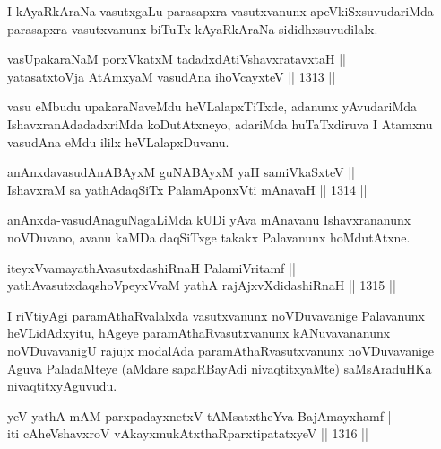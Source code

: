 \begin{artha}
I kAyaRkAraNa vasutxgaLu parasapxra vasutxvanunx apeVkiSxsuvudariMda parasapxra vasutxvanunx biTuTx kAyaRkAraNa sididhxsuvudilalx.
\end{artha}

\begin{shl}
vasUpakaraNaM porxVkatxM tadadxdAtiVshavxratavxtaH || \\
yatasatxtoV\s ja AtAmx\s yaM vasudAna ihoVcayxteV \hfill || 1313 ||  
\end{shl}

\begin{artha}
vasu eMbudu upakaraNaveMdu heVLalapxTiTxde, adanunx yAvudariMda IshavxranAdadadxriMda koDutAtxneyo, adariMda huTaTxdiruva I Atamxnu vasudAna eMdu ililx heVLalapxDuvanu.
\end{artha}

\begin{shl}
anAnxdavasudAnABAyxM guNABAyxM yaH samiVkaSxteV ||  \\
IshavxraM sa yathAdaqSiTx PalamAponxVti mAnavaH \hfill || 1314 ||  
\end{shl}

\begin{artha}
anAnxda-vasudAnaguNagaLiMda kUDi yAva mAnavanu Ishavxrananunx noVDuvano, avanu kaMDa daqSiTxge takakx Palavanunx hoMdutAtxne.
\end{artha}

\begin{shl}
iteyxVvamayathAvasutxdashiRnaH PalamiVritamf || \\
yathAvasutxdaqshoV\s peyxVvaM yathA rajAjxvXdidashiRnaH \hfill || 1315 ||  
\end{shl}

\begin{artha}
I riVtiyAgi paramAthaRvalalxda vasutxvanunx noVDuvavanige Palavanunx heVLidAdxyitu, hAgeye paramAthaRvasutxvanunx kANuvavananunx noVDuvavanigU rajujx modalAda paramAthaRvasutxvanunx noVDuvavanige Aguva PaladaMteye (aMdare sapaRBayAdi nivaqtitxyaMte) saMsAraduHKa nivaqtitxyAguvudu.
\end{artha}


\begin{shl}
yeV yathA mAM parxpadayxnetxV tAMsatxtheYva BajAmayxhamf ||  \\
iti cA\s \s heVshavxroV vAkayxmukAtxthaRparxtipatatxyeV \hfill || 1316 ||  
\end{shl}

